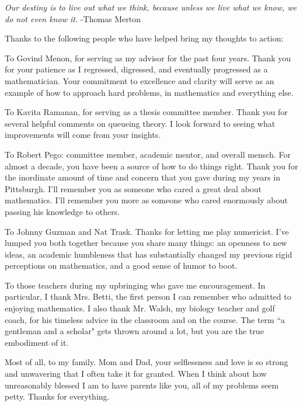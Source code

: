     
\textit{ Our destiny is to live out what we think, because unless we live what we know, we do not even know it.} \hspace{160pt} -Thomas Merton

Thanks to the following people who have helped bring my thoughts to action:

To Govind Menon, for serving as my advisor for the past four years.  Thank you for your patience as I regressed, digressed, and eventually progressed as a mathematician. Your commitment to excellence and clarity will serve as an example of how to approach hard problems, in mathematics and everything else. 

To Kavita Ramanan, for serving as a thesis committee member.  Thank you for several helpful comments on queueing theory. I look forward to seeing what improvements will come from your insights.         

To Robert Pego: committee member, academic mentor, and overall mensch. For almost a decade, you have been a source of how to do things right.  Thank you for the inordinate amount of time and concern that you gave during my years in Pittsburgh. I'll remember you as someone who cared a great deal about mathematics.  I'll remember you more as someone who cared enormously about passing his knowledge to others. 

To Johnny Guzman and Nat Trask.  Thanks for letting me play numericist.  I've lumped you both together because you share many things: an openness to new ideas, an academic humbleness that has substantially changed my previous rigid perceptions on mathematics, and a good sense of humor to boot.  

 To those teachers during my upbringing who gave me encouragement.  In particular, I thank Mrs. Betti, the first person I can remember who admitted to enjoying mathematics.  I also thank Mr. Walsh, my biology teacher and golf coach, for his timeless advice in the classroom and on the course. The term ``a gentleman and a scholar" gets thrown around a lot, but you are the true embodiment of it. 

Most of all, to my family. Mom and Dad, your selflessness and love is so strong and unwavering that I often take it for granted. When I think about how unreasonably blessed I am to have parents like you, all of my problems seem petty. Thanks for everything.               

  

         
 

 

